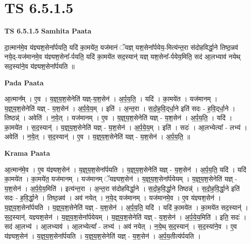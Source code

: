 \documentclass[17pt]{extarticle}
\begin{document}
\section{ TS 6.5.1.5 }

\textbf{TS 6.5.1.5 } \newline
\textbf{Samhita Paata} \newline

दा॒त्मान॑मे॒व य॑ज्ञ्यश॒सेना᳚र्पयति॒ यदि॑ का॒मये॑त॒ यज॑मानं ॅयज्ञ् यश॒सेना᳚र्पयेय॒-मित्य॑न्त॒रा स॑दोहविर्द्धा॒ने तिष्ठ॒न्नव॑ नये॒द्-यज॑मानमे॒व य॑ज्ञ्यश॒सेना᳚-र्पयति॒ यदि॑ का॒मये॑त सद॒स्यान्॑ यज्ञ् यश॒सेना᳚-र्पयेय॒मिति॒ सद॑ आ॒लभ्याव॑ नयेथ् सद॒स्या॑ने॒व य॑ज्ञ्यश॒सेना᳚र्पयति ॥ \newline

\textbf{Pada Paata} \newline

आ॒त्मान᳚म् । ए॒व । य॒ज्ञ्॒य॒श॒सेनेति॑ यज्ञ्-य॒श॒सेन॑ । अ॒र्प॒य॒ति॒ । यदि॑ । का॒मये॑त । यज॑मानम् । य॒ज्ञ्॒य॒श॒सेनेति॑ यज्ञ् - य॒श॒सेन॑ । अ॒र्प॒ये॒य॒म् । इति॑ । अ॒न्त॒रा । स॒दो॒ह॒वि॒द्‌र्धा॒ने इति॑ सदः - ह॒वि॒द्‌र्धा॒ने । तिष्ठन्न्॑ । अवेति॑ । न॒ये॒त् । यज॑मानम् । ए॒व । य॒ज्ञ्॒य॒श॒सेनेति॑ यज्ञ् - य॒श॒सेन॑ । अ॒र्प॒य॒ति॒ । यदि॑ । का॒मये॑त । स॒द॒स्यान्॑ । य॒ज्ञ्॒य॒श॒सेनेति॑ यज्ञ् - य॒श॒सेन॑ । अ॒र्प॒ये॒य॒म् । इति॑ । सदः॑ । आ॒लभ्येत्या᳚ - लभ्य॑ । अवेति॑ । न॒ये॒त् । स॒द॒स्यान्॑ । ए॒व । य॒ज्ञ्॒य॒श॒सेनेति॑ यज्ञ् - य॒श॒सेन॑ । अ॒र्प॒य॒ति॒ ॥  \newline


\textbf{Krama Paata} \newline

आ॒त्मान॑मे॒व । ए॒व य॑ज्ञ्यश॒सेन॑ । य॒ज्ञ्॒य॒श॒सेना᳚र्पयति । य॒ज्ञ्॒य॒श॒सेनेति॑ यज्ञ् - य॒श॒सेन॑ । अ॒र्प॒य॒ति॒ यदि॑ । यदि॑ का॒मये॑त । का॒मये॑त॒ यज॑मानम् । यज॑मानम् ॅयज्ञ्यश॒सेन॑ । य॒ज्ञ्॒य॒श॒सेना᳚र्पयेयम् । य॒ज्ञ्॒य॒श॒सेनेति॑ यज्ञ् - य॒श॒सेन॑ । अ॒र्प॒ये॒य॒मिति॑ । इत्य॑न्त॒रा । अ॒न्त॒रा स॑दोहविर्द्धा॒ने । स॒दो॒ह॒वि॒र्द्धा॒ने तिष्ठन्न्॑ । स॒दो॒ह॒वि॒र्द्धा॒ने इति॑ सदः - ह॒वि॒र्द्धा॒ने । तिष्ठ॒न्नव॑ । अव॑ नयेत् । न॒ये॒द् यज॑मानम् । यज॑मानमे॒व । ए॒व य॑ज्ञ्यश॒सेन॑ । य॒ज्ञ्॒य॒श॒सेना᳚र्पयति । य॒ज्ञ्॒य॒श॒सेनेति॑ यज्ञ् - य॒श॒सेन॑ । अ॒र्प॒य॒ति॒ यदि॑ । यदि॑ का॒मये॑त । का॒मये॑त सद॒स्यान्॑ । स॒द॒स्यान्॑. यज्ञ्यश॒सेन॑ । य॒ज्ञ्॒य॒श॒सेना᳚र्पयेयम् । य॒ज्ञ्॒य॒श॒सेनेति॑ यज्ञ् - य॒श॒सेन॑ । अ॒र्प॒ये॒य॒मिति॑ । इति॒ सदः॑ । सद॑ आ॒लभ्य॑ । आ॒लभ्याव॑ । आ॒लभ्येत्या᳚ - लभ्य॑ । अव॑ नयेत् । न॒ये॒थ् स॒द॒स्यान्॑ । स॒द॒स्या॑ने॒व । ए॒व य॑ज्ञ्यश॒सेन॑ । य॒ज्ञ्॒य॒श॒सेना᳚र्पयति । य॒ज्ञ्॒य॒श॒सेनेति॑ यज्ञ् - य॒श॒सेन॑ । अ॒र्प॒य॒तीत्य॑र्पयति । \newline
\end{document}
